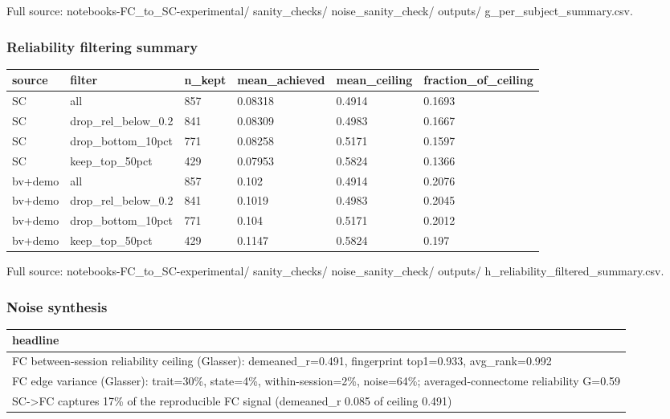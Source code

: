 Full source: notebooks-FC\_to\_SC-experimental/ sanity\_checks/ noise\_sanity\_check/ outputs/ g\_per\_subject\_summary.csv.

\subsubsection{Reliability filtering summary}\label{reliability-filtering-summary}

{\def\LTcaptype{none} %
\begin{longtable}[]{@{}llllll@{}}
\toprule\noalign{}
source & filter & n\_kept & mean\_achieved & mean\_ceiling & fraction\_of\_ceiling \\
\midrule\noalign{}
\endhead
\bottomrule\noalign{}
\endlastfoot
SC & all & 857 & 0.08318 & 0.4914 & 0.1693 \\
SC & drop\_rel\_below\_0.2 & 841 & 0.08309 & 0.4983 & 0.1667 \\
SC & drop\_bottom\_10pct & 771 & 0.08258 & 0.5171 & 0.1597 \\
SC & keep\_top\_50pct & 429 & 0.07953 & 0.5824 & 0.1366 \\
bv+demo & all & 857 & 0.102 & 0.4914 & 0.2076 \\
bv+demo & drop\_rel\_below\_0.2 & 841 & 0.1019 & 0.4983 & 0.2045 \\
bv+demo & drop\_bottom\_10pct & 771 & 0.104 & 0.5171 & 0.2012 \\
bv+demo & keep\_top\_50pct & 429 & 0.1147 & 0.5824 & 0.197 \\
\end{longtable}
}

Full source: notebooks-FC\_to\_SC-experimental/ sanity\_checks/ noise\_sanity\_check/ outputs/ h\_reliability\_filtered\_summary.csv.

\subsubsection{Noise synthesis}\label{noise-synthesis}

{\def\LTcaptype{none} %
\begin{longtable}[]{@{}l@{}}
\toprule\noalign{}
headline \\
\midrule\noalign{}
\endhead
\bottomrule\noalign{}
\endlastfoot
FC between-session reliability ceiling (Glasser): demeaned\_r=0.491, fingerprint top1=0.933, avg\_rank=0.992 \\
FC edge variance (Glasser): trait=30\%, state=4\%, within-session=2\%, noise=64\%; averaged-connectome reliability G=0.59 \\
SC-\textgreater FC captures 17\% of the reproducible FC signal (demeaned\_r 0.085 of ceiling 0.491) \\
\end{longtable}
}

